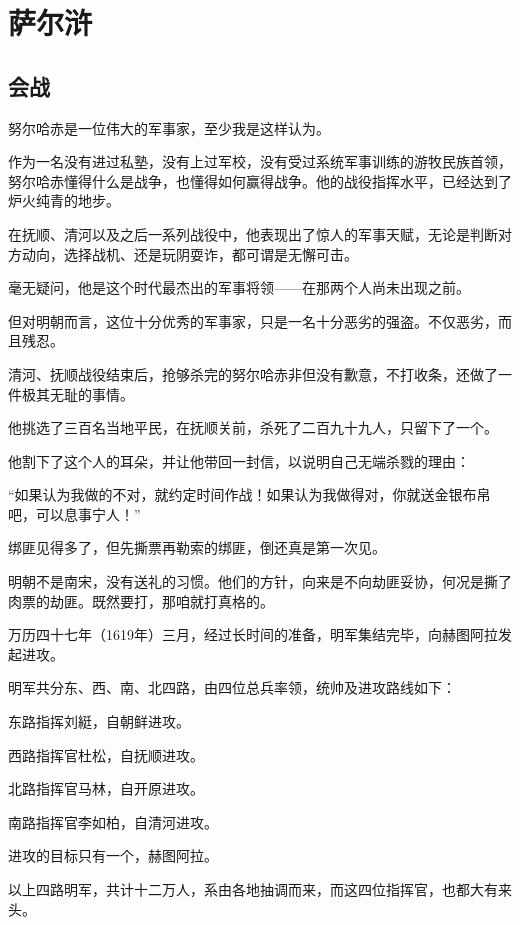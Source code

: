 \section{萨尔浒}
\ifnum{}
	\begin{multicols}{\theparacolNo}
		\fi
		\subsection{会战}
		努尔哈赤是一位伟大的军事家，至少我是这样认为。

		作为一名没有进过私塾，没有上过军校，没有受过系统军事训练的游牧民族首领，努尔哈赤懂得什么是战争，也懂得如何赢得战争。他的战役指挥水平，已经达到了炉火纯青的地步。

		在抚顺、清河以及之后一系列战役中，他表现出了惊人的军事天赋，无论是判断对方动向，选择战机、还是玩阴耍诈，都可谓是无懈可击。

		毫无疑问，他是这个时代最杰出的军事将领——在那两个人尚未出现之前。

		但对明朝而言，这位十分优秀的军事家，只是一名十分恶劣的强盗。不仅恶劣，而且残忍。

		清河、抚顺战役结束后，抢够杀完的努尔哈赤非但没有歉意，不打收条，还做了一件极其无耻的事情。

		他挑选了三百名当地平民，在抚顺关前，杀死了二百九十九人，只留下了一个。

		他割下了这个人的耳朵，并让他带回一封信，以说明自己无端杀戮的理由：

		“如果认为我做的不对，就约定时间作战！如果认为我做得对，你就送金银布帛吧，可以息事宁人！”

		绑匪见得多了，但先撕票再勒索的绑匪，倒还真是第一次见。

		明朝不是南宋，没有送礼的习惯。他们的方针，向来是不向劫匪妥协，何况是撕了肉票的劫匪。既然要打，那咱就打真格的。

		万历四十七年（1619年）三月，经过长时间的准备，明军集结完毕，向赫图阿拉发起进攻。

		明军共分东、西、南、北四路，由四位总兵率领，统帅及进攻路线如下：

		东路指挥刘綎，自朝鲜进攻。

		西路指挥官杜松，自抚顺进攻。

		北路指挥官马林，自开原进攻。

		南路指挥官李如柏，自清河进攻。

		进攻的目标只有一个，赫图阿拉。

		以上四路明军，共计十二万人，系由各地抽调而来，而这四位指挥官，也都大有来头。


\end{multicols}
